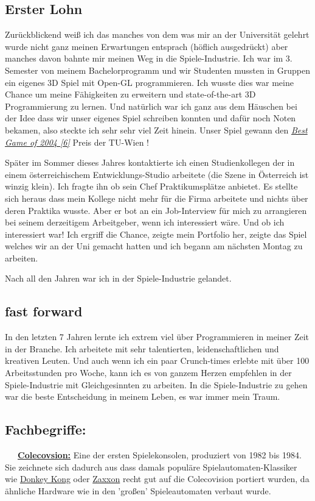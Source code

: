 \documentclass[10pt,a4paper,ngerman,twoside]{article} %
\begin{document}
\subsection*{Erster Lohn}

Zurückblickend weiß ich das manches von dem was mir an der Universität gelehrt wurde nicht ganz meinen Erwartungen entsprach (höflich ausgedrückt) aber manches davon bahnte mir meinen Weg in die Spiele-Industrie. Ich war im 3. Semester von meinem Bachelorprogramm und wir Studenten mussten in Gruppen ein eigenes 3D Spiel mit Open-GL programmieren. Ich wusste dies war meine Chance um meine Fähigkeiten zu erweitern und state-of-the-art 3D Programmierung zu lernen. Und natürlich war ich ganz aus dem Häuschen bei der Idee dass wir unser eigenes Spiel schreiben konnten und dafür noch Noten bekamen, also steckte ich sehr sehr viel Zeit hinein. Unser Spiel gewann den \href{http://www.cg.tuwien.ac.at/courses/CG23/HallOfFame/2004/}{\textit{Best Game of 2004 [6]}} Preis der TU-Wien !

Später im Sommer dieses Jahres kontaktierte ich einen Studienkollegen der in einem österreichischem Entwicklungs-Studio arbeitete (die Szene in Österreich ist winzig klein). Ich fragte ihn ob sein Chef Praktikumsplätze anbietet. Es stellte sich heraus dass mein Kollege nicht mehr für die Firma arbeitete und nichts über deren Praktika wusste. Aber er bot an ein Job-Interview für mich zu arrangieren bei seinem derzeitigem Arbeitgeber, wenn ich interessiert wäre. Und ob ich interessiert war! Ich ergriff die Chance, zeigte mein Portfolio her, zeigte das Spiel welches wir an der Uni gemacht hatten und ich begann am nächsten Montag zu arbeiten.

Nach all den Jahren war ich in der Spiele-Industrie gelandet.

\subsection*{fast forward}

In den letzten 7 Jahren lernte ich extrem viel über Programmieren in meiner Zeit in der Branche. Ich arbeitete mit sehr talentierten, leidenschaftlichen und kreativen Leuten. Und auch wenn ich ein paar Crunch-times erlebte mit über 100 Arbeitsstunden pro Woche, kann ich es von ganzem Herzen empfehlen in der Spiele-Industrie mit Gleichgesinnten zu arbeiten. In die Spiele-Industrie zu gehen war die beste Entscheidung in meinem Leben, es war immer mein Traum.

\subsection*{Fachbegriffe:}
~~~\href{https://de.wikipedia.org/wiki/Colecovision}{\textbf{Colecovsion:}} Eine der ersten Spielekonsolen, produziert von 1982 bis 1984. Sie zeichnete sich dadurch aus dass damals populäre Spielautomaten-Klassiker wie \href{https://de.wikipedia.org/wiki/Donkey_Kong}{Donkey Kong} oder \href{https://de.wikipedia.org/wiki/Zaxxon}{Zaxxon} recht gut auf die Colecovision portiert wurden, da ähnliche Hardware wie in den 'großen' Spieleautomaten verbaut wurde.
\end{document}
